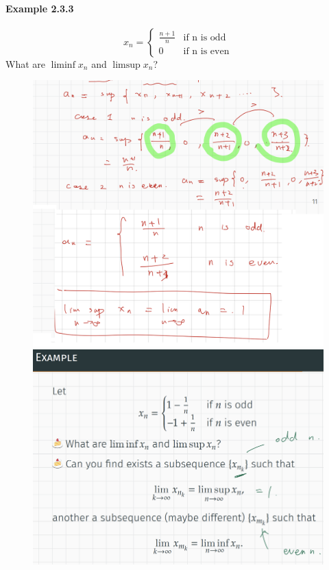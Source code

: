 \documentclass{article}
\begin{document}
\paragraph{Example 2.3.3}
$$x_n=\begin{cases}
    \frac{n+1}{n} & \text{if n is odd}\\
    0 & \text{if n is even}
\end{cases}$$
What are $\liminf{x_n}$ and $\limsup{x_n}$?
\begin{figure}[H]
    \centering
    \includegraphics{0130}
    \includegraphics{0131}
\end{figure}
\end{document}
